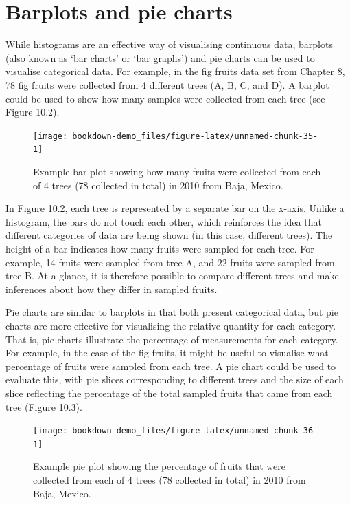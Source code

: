 \documentclass[
]{scrbook}
\begin{document}
\hypertarget{barplots-and-pie-charts}{%
\section{Barplots and pie charts}\label{barplots-and-pie-charts}}

While histograms are an effective way of visualising continuous data, barplots (also known as `bar charts' or `bar graphs') and pie charts can be used to visualise categorical data.
For example, in the fig fruits data set from \protect\hyperlink{Chapter_8}{Chapter 8}, 78 fig fruits were collected from 4 different trees (A, B, C, and D).
A barplot could be used to show how many samples were collected from each tree (see Figure 10.2).

\begin{figure}
\texttt{[image: bookdown-demo\_files/figure-latex/unnamed-chunk-35-1]} \caption{Example bar plot showing how many fruits were collected from each of 4 trees (78 collected in total) in 2010 from Baja, Mexico.}\label{fig:unnamed-chunk-35}
\end{figure}

In Figure 10.2, each tree is represented by a separate bar on the x-axis.
Unlike a histogram, the bars do not touch each other, which reinforces the idea that different categories of data are being shown (in this case, different trees).
The height of a bar indicates how many fruits were sampled for each tree.
For example, 14 fruits were sampled from tree A, and 22 fruits were sampled from tree B.
At a glance, it is therefore possible to compare different trees and make inferences about how they differ in sampled fruits.

Pie charts are similar to barplots in that both present categorical data, but pie charts are more effective for visualising the relative quantity for each category.
That is, pie charts illustrate the percentage of measurements for each category.
For example, in the case of the fig fruits, it might be useful to visualise what percentage of fruits were sampled from each tree.
A pie chart could be used to evaluate this, with pie slices corresponding to different trees and the size of each slice reflecting the percentage of the total sampled fruits that came from each tree (Figure 10.3).

\begin{figure}
\texttt{[image: bookdown-demo\_files/figure-latex/unnamed-chunk-36-1]} \caption{Example pie plot showing the percentage of fruits that were collected from each of 4 trees (78 collected in total) in 2010 from Baja, Mexico.}\label{fig:unnamed-chunk-36}
\end{figure}
\end{document}
